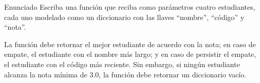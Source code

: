 \documentclass{ip-quiz}
\begin{document}
\makeheader
\maketitle

\begin{sectionbox}{Enunciado}
Escriba una función que reciba como parámetros cuatro estudiantes, cada uno modelado como un diccionario con las llaves ``nombre'', ``código'' y ``nota''. 

La función debe retornar el mejor estudiante de acuerdo con la nota; en caso de empate, el estudiante con el nombre más largo; y en caso de persistir el empate, el estudiante con el código más reciente. Sin embargo, si ningún estudiante alcanza la nota mínima de 3.0, la función debe retornar un diccionario vacío.
\end{sectionbox}

\pagebreak
\end{document}
